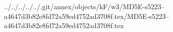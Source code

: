 ../../../../../.git/annex/objects/kF/w3/MD5E-s5223--a4647d3b82e8fd72a59ed4752ad3708f.tex/MD5E-s5223--a4647d3b82e8fd72a59ed4752ad3708f.tex
